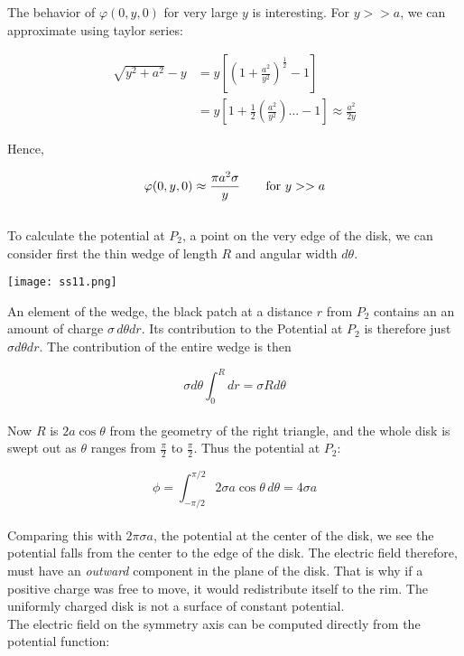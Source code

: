 \documentclass[svgnames]{article}
\begin{document}
The behavior of $\varphi (0, y, 0)$ for very large $y$ is interesting. For $ y >> a$, we can approximate using taylor series: 

\begin{align*} \sqrt{y^2 + a^2} - y &= y \left[\left(1+\frac{a^2}{y^2}\right)^\frac{1}{2} - 1 \right] \\
&= y \left[1 + \frac{1}{2} \left(\frac{a^2}{y^2}\right) \dots - 1 \right] \approx \frac{a^2}{2y} 
\end{align*}

Hence, 

\[ \varphi(0, y, 0) \approx \frac{\pi a^2 \sigma}{y} \hspace{20px} \text{for $y >> a$} \] \\ 

To calculate the potential at $P_2$, a point on the very edge of the disk, we can consider first the thin wedge of length $R$ and angular width $d\theta$. 

\begin{center}
\texttt{[image: ss11.png]}
\end{center} 

An element of the wedge, the black patch at a distance $r$ from $P_2$ contains an an amount of charge $\sigma \, d\theta dr$. Its contribution to the Potential at $P_2$ is therefore just $\sigma d\theta dr$. The contribution of the entire wedge is then 

\[ \sigma d\theta \int_0^R dr = \sigma R d\theta \]\\

Now $R$ is $2a\cos\theta$ from the geometry of the right triangle, and the whole disk is swept out as $\theta$ ranges from $\frac{\pi}{2}$ to $\frac{\pi}{2}$. Thus the potential at $P_2$: 

\[ \phi = \int_{-\pi / 2}^{\pi / 2} 2\sigma a \cos \theta \, d\theta = 4\sigma a \] \\

Comparing this with $2\pi \sigma a$, the potential at the center of the disk, we see the potential falls from the center to the edge of the disk. The electric field therefore, must have an \textit{outward} component in the plane of the disk. That is why if a positive charge was free to move, it would redistribute itself to the rim. The uniformly charged disk is not a surface of constant potential. \\

The electric field on the symmetry axis can be computed directly from the potential function: 
\end{document}
